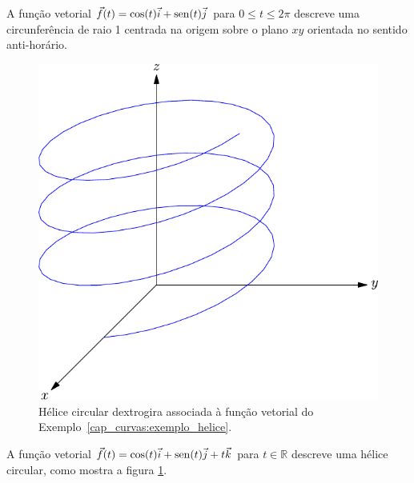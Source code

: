 \begin{ex}
A função vetorial $\vec{f}(t)=\cos(t)\vec{i}+\operatorname{sen}(t)\vec{j}$ para $0\leq t \leq 2\pi$ descreve  uma circunferência de raio 1 centrada na origem sobre o plano $xy$ orientada no sentido anti-horário.
\end{ex}

\begin{figure}%
\begin{center}
    \includegraphics{./cap_curvas/pics/helice}
\caption{\label{helicedex}Hélice circular dextrogira associada à função vetorial do Exemplo~\ref{cap_curvas:exemplo_helice}.}
  \end{center}
\end{figure}

\begin{ex}\label{cap_curvas:exemplo_helice}
A função vetorial $\vec{f}(t)=\cos(t)\vec{i}+\operatorname{sen}(t)\vec{j}+t\vec{k}$ para $ t \in\mathbb{R}$ descreve uma hélice circular, como mostra a figura \ref{helicedex}.
\end{ex}

